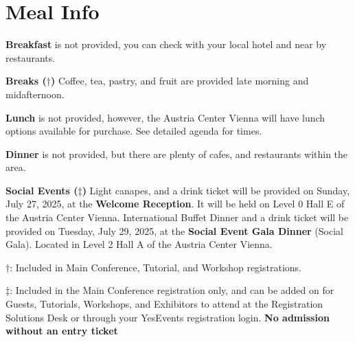\chapter{Meal Info}
\vspace*{0.2cm}

\textbf{Breakfast} is not provided, you can check with your local hotel and near by restaurants.

\textbf{Breaks ($\dagger$)} Coffee, tea, pastry, and fruit are provided late morning and midafternoon.

\textbf{Lunch} is not provided, however, the Austria Center Vienna will have lunch options available for purchase. See detailed agenda for times. 

\textbf{Dinner} is  not provided, but there are plenty of cafes, and restaurants within the area.

\textbf{Social Events ($\ddagger$)} 
Light canapes, and a drink ticket will be provided on Sunday, July 27, 2025, at the \textbf{Welcome Reception}. It will be held on Level 0 Hall E of the Austria Center Vienna. 
International Buffet Dinner and a drink ticket will be provided on Tuesday, July 29, 2025, at the \textbf{Social Event Gala Dinner} (Social Gala). Located in Level 2 Hall A of the Austria Center Vienna.

\vspace{4em}

$\dagger$: Included in Main Conference, Tutorial, and Workshop registrations.

$\ddagger$: Included in the Main Conference registration only, and can be added on for Guests, Tutorials, Workshops, and Exhibitors to attend at the Registration Solutions Desk or through your YesEvents registration login. \textbf{No admission without an entry ticket}
